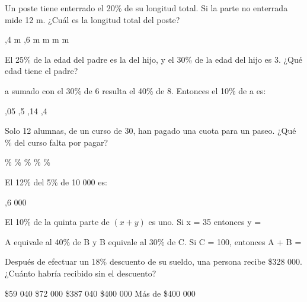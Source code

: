 \documentclass[pagina vacia]{srs}
\begin{document}
\begin{preguntas}[after-item-skip=2cm]
\pregunta Un poste tiene enterrado el 20\% de su longitud total. Si la parte no enterrada mide 12 m. ¿Cuál es la longitud total del poste?
\begin{vertical}
,4 m
,6 m
 m
 m
 m
\end{vertical}

\pregunta El 25\% de la edad del padre es la del hijo, y el 30\% de la edad del hijo es 3. ¿Qué edad tiene el padre?
\begin{vertical}
\end{vertical}

\pregunta a sumado con el 30\% de 6 resulta el 40\% de 8. Entonces el 10\% de a es:
\begin{vertical}
,05
,5
,14
,4
\end{vertical}

\pregunta Solo 12 alumnas, de un curso de 30, han pagado una cuota para un paseo. ¿Qué \% del curso falta por pagar?
\begin{vertical}
\%
\%
\%
\%
\%
\end{vertical}

\pregunta El 12\% del 5\% de 10 000 es:
\begin{vertical}
,6
 000
\end{vertical}

\pregunta El 10\% de la quinta parte de \((x + y)\) es uno. Si x = 35 entonces y =
\begin{vertical}
\end{vertical}

\pregunta A equivale al 40\% de B y B equivale al 30\% de C. Si C = 100, entonces A + B =
\begin{vertical}
\end{vertical}

\pregunta Después de efectuar un 18\% descuento de su sueldo, una persona recibe \$328 000. ¿Cuánto habría recibido sin el descuento?
\begin{vertical}
\alternativa \$59 040
\alternativa \$72 000
\alternativa \$387 040
\alternativa \$400 000
\alternativa Más de \$400 000
\end{vertical}


\end{preguntas}
\end{document}
